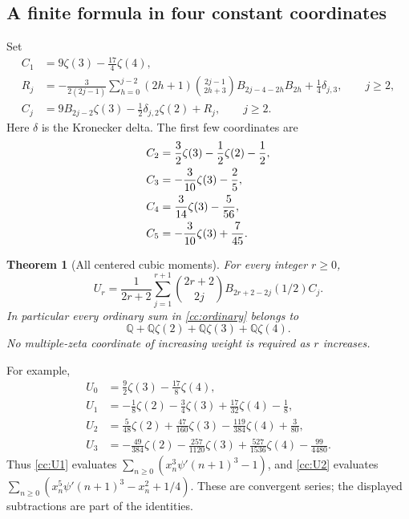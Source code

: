 \documentclass[11pt,letterpaper]{article}
\newtheorem{theorem}{Theorem}[section]
\theoremstyle{definition}
\theoremstyle{remark}
\numberwithin{equation}{section}
\begin{document}
\subsection{A finite formula in four constant coordinates}

Set
\begin{align}
 C_1&=9\zeta(3)-\frac{17}{4}\zeta(4),
       \label{cc:C1}\\
 R_j&=-\frac{3}{2(2j-1)}
       \sum_{h=0}^{j-2}(2h+1)\binom{2j-1}{2h+3}
          B_{2j-4-2h}B_{2h}
       +\frac14\delta_{j,3},\qquad j\ge2,
       \label{cc:Rj}\\
 C_j&=9B_{2j-2}\zeta(3)-\frac12\delta_{j,2}\zeta(2)+R_j,
       \qquad j\ge2.
       \label{cc:Cj}
\end{align}
Here $\delta$ is the Kronecker delta.  The first few coordinates are
\begin{align}
 C_2&=\frac32\zeta(3)-\frac12\zeta(2)-\frac12,
       \notag\\
 C_3&=-\frac3{10}\zeta(3)-\frac25,
       \notag\\
 C_4&=\frac3{14}\zeta(3)-\frac5{56},
       \notag\\
 C_5&=-\frac3{10}\zeta(3)+\frac7{45}.
       \label{cc:Cexamples}
\end{align}

\begin{theorem}[All centered cubic moments]
\label{cc:all}
For every integer $r\ge0$,
\begin{equation}\label{cc:allformula}
 \boxed{\displaystyle
 U_r=\frac1{2r+2}\sum_{j=1}^{r+1}
      \binom{2r+2}{2j}B_{2r+2-2j}(1/2)C_j.}
\end{equation}
In particular every ordinary sum in \eqref{cc:ordinary} belongs to
\[
 \mathbb Q+\mathbb Q\zeta(2)+\mathbb Q\zeta(3)+\mathbb Q\zeta(4).
\]
No multiple-zeta coordinate of increasing weight is required as $r$
increases.
\end{theorem}

For example,
\begin{align}
 U_0&=\frac92\zeta(3)-\frac{17}{8}\zeta(4),
       \label{cc:U0}\\
 U_1&=-\frac18\zeta(2)-\frac34\zeta(3)
          +\frac{17}{32}\zeta(4)-\frac18,
       \label{cc:U1}\\
 U_2&=\frac5{48}\zeta(2)+\frac{47}{160}\zeta(3)
          -\frac{119}{384}\zeta(4)+\frac3{80},
       \label{cc:U2}\\
 U_3&=-\frac{49}{384}\zeta(2)-\frac{257}{1120}\zeta(3)
          +\frac{527}{1536}\zeta(4)-\frac{99}{4480}.
       \label{cc:U3}
\end{align}
Thus \eqref{cc:U1} evaluates
$\sum_{n\ge0}(x_n^3\psi'(n+1)^3-1)$, and
\eqref{cc:U2} evaluates
$\sum_{n\ge0}(x_n^5\psi'(n+1)^3-x_n^2+1/4)$.
These are convergent series; the displayed subtractions are part of
the identities.
\end{document}
